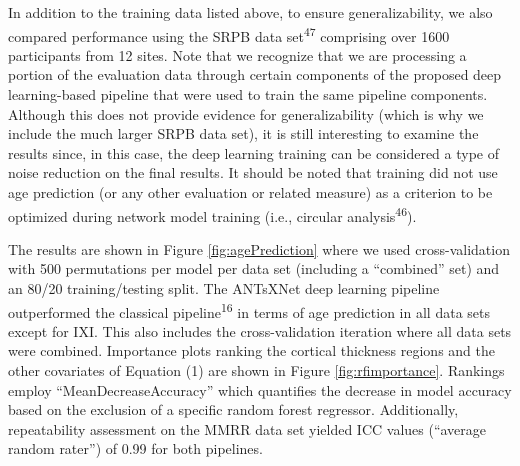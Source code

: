 \documentclass[12pt,]{article}
\begin{document}
In addition to the training data listed above, to ensure
generalizability, we also compared performance using the SRPB data
set\textsuperscript{47} comprising over 1600 participants from 12 sites.
Note that we recognize that we are processing a portion of the
evaluation data through certain components of the proposed deep
learning-based pipeline that were used to train the same pipeline
components. Although this does not provide evidence for generalizability
(which is why we include the much larger SRPB data set), it is still
interesting to examine the results since, in this case, the deep
learning training can be considered a type of noise reduction on the
final results. It should be noted that training did not use age
prediction (or any other evaluation or related measure) as a criterion
to be optimized during network model training (i.e., circular
analysis\textsuperscript{46}).

The results are shown in Figure \ref{fig:agePrediction} where we used
cross-validation with 500 permutations per model per data set (including
a ``combined'' set) and an 80/20 training/testing split. The ANTsXNet
deep learning pipeline outperformed the classical
pipeline\textsuperscript{16} in terms of age prediction in all data sets
except for IXI. This also includes the cross-validation iteration where
all data sets were combined. Importance plots ranking the cortical
thickness regions and the other covariates of Equation (1) are shown in
Figure \ref{fig:rfimportance}. Rankings employ ``MeanDecreaseAccuracy''
which quantifies the decrease in model accuracy based on the exclusion
of a specific random forest regressor. Additionally, repeatability
assessment on the MMRR data set yielded ICC values (``average random
rater'') of 0.99 for both pipelines.
\end{document}
